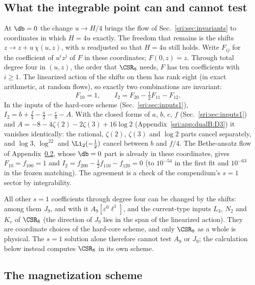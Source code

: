 \subsection{What the integrable point can and cannot test}\label{sri:app:integ:gauge}
At $\db=0$ the change $u\to H/4$ brings the flow of Sec.~\ref{sri:sec:invariants} to coordinates in which $H=4u$
exactly. The freedom that remains is the shifts $z\to z+u\,\chi(u,z)$, with $u$ readjusted so that $H=4u$ still
holds. Write $F_{ij}$ for the coefficient of $u^iz^j$ of $F$ in these coordinates; $F(0,z)=z$. Through total degree
four in $(u,z)$, the order that $\CSR_8$ needs, $F$ has ten coefficients with $i\ge1$. The linearized action of the
shifts on them has rank eight (in exact arithmetic, at random flows), so exactly two combinations are invariant:
\begin{equation}
 F_{10}=1,\qquad I_2=F_{20}-\tfrac12F_{11}-F_{12}.
\end{equation}
In the inputs of the hard-core scheme (Sec.~\ref{sri:sec:inputs1}), $I_2=b+\frac f4-\frac a2-\frac c8-A$. With the closed
forms of $a$, $b$, $c$, $f$ (Sec.~\ref{sri:sec:inputs1}) and $A=-8-4\zeta(2)-2\zeta(3)+16\log2$
(Appendix~\ref{sri:app:dualB:D3}) it vanishes identically: the rational, $\zeta(2)$, $\zeta(3)$ and $\log2$ parts cancel
separately, and $\log3$, $\log^22$ and $\Li_2(-\frac12)$ cancel between $b$ and $f/4$. The Bethe-ansatz flow of
Appendix~\ref{sri:app:integ:scheme}, whose $\db=0$ part is already in these coordinates, gives $F_{10}=f_{100}=1$ and
$I_2=f_{200}-\frac12f_{110}-f_{120}=0$ (to $10^{-54}$ in the first fit and $10^{-63}$ in the frozen matching). The agreement is a check of the compendium's $s=1$ sector by
integrability.

All other $s=1$ coefficients through degree four can be changed by the shifts: among them $J_9$, and with it
$A_9[\varepsilon^0\ell^1]$, and the current-type inputs $L_3$, $N_2$ and $K_v$ of $\CSR_8$ (the direction of $J_9$ lies
in the span of the linearized action). They are coordinate choices of the hard-core scheme, and only $\CSR_8$ as a
whole is physical. The $s=1$ solution alone therefore cannot test $A_9$ or $J_9$; the calculation below instead
computes $\CSR_8$ in its own scheme.

\subsection{The magnetization scheme}\label{sri:app:integ:scheme}
